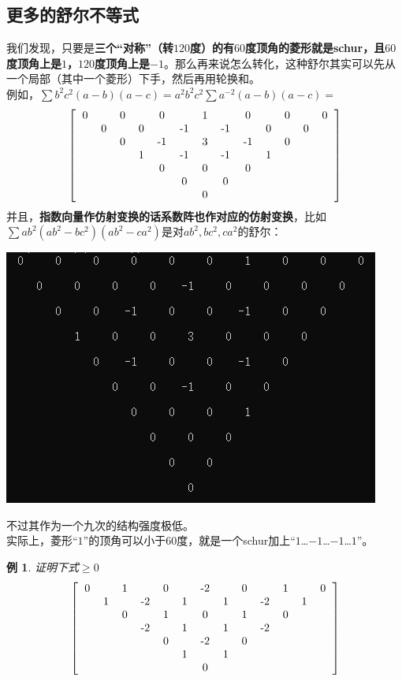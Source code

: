 \documentclass[UTF8]{ctexart}
\newtheorem{1}{例}
\begin{document}
\subsection{更多的舒尔不等式}
我们发现，只要是\textbf{三个“对称”（转$ 120 $度）的有$ 60 $度顶角的菱形就是schur，且$ 60 $度顶角上是$ 1 $，$ 120 $度顶角上是$ -1 $}。那么再来说怎么转化，这种舒尔其实可以先从一个局部（其中一个菱形）下手，然后再用轮换和。\\
例如，$ \displaystyle \sum  b^{2}c^{2}(a-b)(a-c)=a^{2}b^{2}c^{2}\displaystyle \sum  a^{-2}(a-b)(a-c)= $
\renewcommand*{\arraystretch}{1.732}\[
\left[\begin{matrix}
	\begin{tabular}{ccccccccccccc}
		0& &0& &0& &1& &0& &0& &0\\
		&0& &0& &-1& &-1& &0& &0&\\
		& &0& &-1& &3& &-1& &0& &\\
		& & &1& &-1& &-1& &1& & &\\
		& & & &0& &0& &0& & & &\\
		& & & & &0& &0& & & & &\\
		& & & & & &0& & & & & &\\
	\end{tabular}
\end{matrix}\right]
\]
并且，\textbf{指数向量作仿射变换的话系数阵也作对应的仿射变换}，比如\\
$ \displaystyle \sum  ab^{2}(ab^{2}-bc^{2})(ab^{2}-ca^{2}) $是对$ ab^{2},bc^{2},ca^{2} $的舒尔：
\begin{center}
	\includegraphics[width=0.5\linewidth]{0200}
\end{center}
不过其作为一个九次的结构强度极低。\\
实际上，菱形“$ 1 $”的顶角可以小于$ 60 $度，就是一个schur加上“$ 1 $…$ -1 $…$ -1 $…$ 1 $”。
\begin{1}
证明下式$ \geq 0 $\\
\textnormal{\renewcommand*{\arraystretch}{1.732}\[\left[\begin{matrix}
	\begin{tabular}{ccccccccccccc}
		0&  &1  &  & 0 &  & -2 &  & 0 &  & 1 &  & 0\\
		&1  &  & -2 &  & 1 &  & 1 &  & -2 &  & 1 & \\
		&  & 0 &  & 1 &  &  0&  &  1&  &  0&  & \\
		&  &  &  -2 &  & 1 &  & 1 &  & -2  &  &  & \\
		&  &  &  &  0&  &-2  &  & 0 &  &  &  & \\
		&  &  &  &  &  1&  &1  &  &  &  &  & \\
		&  &  &  &  &  &  0&  &  &  &  &  & \\
	\end{tabular}
\end{matrix}\right]\]}
\end{1}
\end{document}
